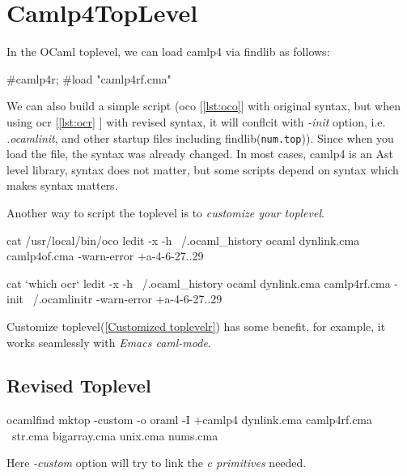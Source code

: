 \section{Camlp4TopLevel}
\label{sec:camlp4toplevel}

In the OCaml toplevel, we can load camlp4 via findlib as follows:

\begin{ocamlcode}
#camlp4r;
#load "camlp4rf.cma"
\end{ocamlcode}

We can also build a simple script (oco [\ref{lst:oco}] with original
syntax, but when using ocr [\ref{lst:ocr} ] with revised syntax, it
will conflcit with \textit{-init} option, i.e. \textit{.ocamlinit},
and other startup files including findlib(\verb|num.top|)). Since when
you load the file, the syntax was already changed.  In most cases,
camlp4 is an Ast level library, syntax does not matter, but some
scripts depend on syntax which makes syntax matters.

Another way to script the toplevel is to \textit{customize your
  toplevel}.

\begin{bashcode}
cat /usr/local/bin/oco
ledit -x -h ~/.ocaml_history ocaml dynlink.cma camlp4of.cma -warn-error +a-4-6-27..29
\end{bashcode}


\begin{bashcode}
cat `which ocr`
ledit -x -h ~/.ocaml_history ocaml dynlink.cma camlp4rf.cma -init ~/.ocamlinitr -warn-error +a-4-6-27..29
\end{bashcode}

Customize toplevel(\ref{Customized toplevelr}) has some benefit, for
example, it works seamlessly with \textit{Emacs caml-mode}. 


\subsection{Revised Toplevel}
\begin{ocamlcode}
  ocamlfind mktop -custom -o oraml -I +camlp4 dynlink.cma camlp4rf.cma \
  str.cma bigarray.cma unix.cma nums.cma 
\end{ocamlcode}

Here \textit{-custom} option will try to link the \textit{c
  primitives} needed.

